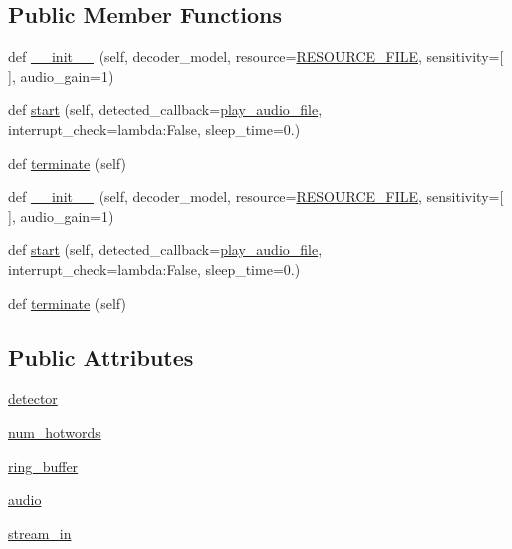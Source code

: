 \subsection*{Public Member Functions}
\begin{DoxyCompactItemize}
\item 
def \hyperlink{classsnowboydecoder_1_1HotwordDetector_a22091f02a8fea2f6065f8bc45addf7fc}{\+\_\+\+\_\+init\+\_\+\+\_\+} (self, decoder\+\_\+model, resource=\hyperlink{namespacesnowboydecoder_ae9aa648d909800942df02cc34b56b83a}{R\+E\+S\+O\+U\+R\+C\+E\+\_\+\+F\+I\+LE}, sensitivity=\mbox{[}$\,$\mbox{]}, audio\+\_\+gain=1)
\item 
def \hyperlink{classsnowboydecoder_1_1HotwordDetector_a0b753c51c1a02be091a7673870cd74e6}{start} (self, detected\+\_\+callback=\hyperlink{namespacesnowboydecoder_ad1759aa8135729988614c8c6709c95fe}{play\+\_\+audio\+\_\+file}, interrupt\+\_\+check=lambda\+:\+False, sleep\+\_\+time=0.)
\item 
def \hyperlink{classsnowboydecoder_1_1HotwordDetector_a1ab6e303be1e4dbd5adaa9b9d29dfa1a}{terminate} (self)
\item 
def \hyperlink{classsnowboydecoder_1_1HotwordDetector_a22091f02a8fea2f6065f8bc45addf7fc}{\+\_\+\+\_\+init\+\_\+\+\_\+} (self, decoder\+\_\+model, resource=\hyperlink{namespacesnowboydecoder_ae9aa648d909800942df02cc34b56b83a}{R\+E\+S\+O\+U\+R\+C\+E\+\_\+\+F\+I\+LE}, sensitivity=\mbox{[}$\,$\mbox{]}, audio\+\_\+gain=1)
\item 
def \hyperlink{classsnowboydecoder_1_1HotwordDetector_a0b753c51c1a02be091a7673870cd74e6}{start} (self, detected\+\_\+callback=\hyperlink{namespacesnowboydecoder_ad1759aa8135729988614c8c6709c95fe}{play\+\_\+audio\+\_\+file}, interrupt\+\_\+check=lambda\+:\+False, sleep\+\_\+time=0.)
\item 
def \hyperlink{classsnowboydecoder_1_1HotwordDetector_a1ab6e303be1e4dbd5adaa9b9d29dfa1a}{terminate} (self)
\end{DoxyCompactItemize}
\subsection*{Public Attributes}
\begin{DoxyCompactItemize}
\item 
\hyperlink{classsnowboydecoder_1_1HotwordDetector_a443f1b4a74ff9e6dab682d9161b7aa52}{detector}
\item 
\hyperlink{classsnowboydecoder_1_1HotwordDetector_a45759e8fb8047abaf3697071cb88364c}{num\+\_\+hotwords}
\item 
\hyperlink{classsnowboydecoder_1_1HotwordDetector_ae5f5881d045e26f9e750b5e03c99f29c}{ring\+\_\+buffer}
\item 
\hyperlink{classsnowboydecoder_1_1HotwordDetector_a747f6301374f25541183bd2b7f0baac6}{audio}
\item 
\hyperlink{classsnowboydecoder_1_1HotwordDetector_a2658be70bb0b1939517e24f008d392a2}{stream\+\_\+in}
\end{DoxyCompactItemize}


